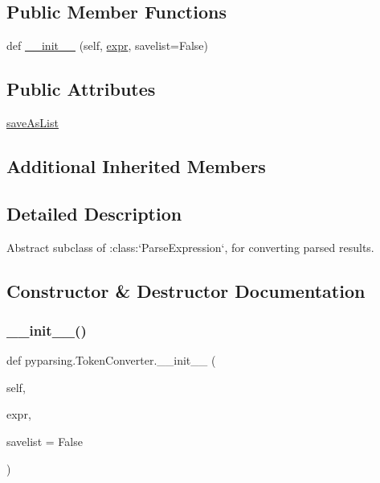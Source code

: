 \subsection*{Public Member Functions}
\begin{DoxyCompactItemize}
\item 
def \hyperlink{classpyparsing_1_1TokenConverter_a394730cf2884957692d9bd454f0bc5c2}{\+\_\+\+\_\+init\+\_\+\+\_\+} (self, \hyperlink{classpyparsing_1_1ParseElementEnhance_a0139048279aeac38804a10d131d3c340}{expr}, savelist=False)
\end{DoxyCompactItemize}
\subsection*{Public Attributes}
\begin{DoxyCompactItemize}
\item 
\hyperlink{classpyparsing_1_1TokenConverter_a6aa78576e71aa67cd5638792ced778c1}{save\+As\+List}
\end{DoxyCompactItemize}
\subsection*{Additional Inherited Members}


\subsection{Detailed Description}
\begin{DoxyVerb}Abstract subclass of :class:`ParseExpression`, for converting parsed results.
\end{DoxyVerb}
 

\subsection{Constructor \& Destructor Documentation}
\mbox{\label{classpyparsing_1_1TokenConverter_a394730cf2884957692d9bd454f0bc5c2}} 
\subsubsection{\texorpdfstring{\+\_\+\+\_\+init\+\_\+\+\_\+()}{\_\_init\_\_()}}
{\footnotesize\ttfamily def pyparsing.\+Token\+Converter.\+\_\+\+\_\+init\+\_\+\+\_\+ (\begin{DoxyParamCaption}\item[{}]{self,  }\item[{}]{expr,  }\item[{}]{savelist = {\ttfamily False} }\end{DoxyParamCaption})}



